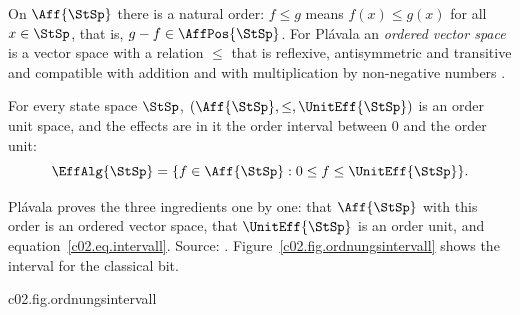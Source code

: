 \begin{fundament}[id=c02.f1,
    titel={Order unit spaces},
    wozu={The effects of a state space form an interval in an ordered vector space with
      an order unit. Here this structure is stated as Plávala gives it for finite
      dimension, and it is said what the course still owes beyond that.},
    voraussetzung={Block~\ref{c02.v2}; partial orders. Neither the core nor the other
      blocks need this block.},
    zurueck={A theory can be started from its states or from its effects; in finite
      dimension both lead to the same framework.}]
  On $\Aff{\StSp}$ there is a natural order: $f \leq g$ means $f(x) \leq g(x)$ for all
  $x \in \StSp$, that is, $g - f \in \AffPos{\StSp}$. For Plávala an \emph{ordered vector
  space} is a vector space with a relation $\leq$ that is reflexive, antisymmetric and
  transitive and compatible with addition and with multiplication by non-negative numbers
  .


  \begin{proposition}\label{c02.prop.oeraum}
    For every state space $\StSp$, $(\Aff{\StSp}, \leq, \UnitEff{\StSp})$ is an order unit
    space, and the effects are in it the order interval between $0$ and the order unit:
    \begin{equation}\label{c02.eq.intervall}
      \EffAlg{\StSp} = \{ f \in \Aff{\StSp} : 0 \leq f \leq \UnitEff{\StSp} \} .
    \end{equation}
  \end{proposition}

  Plávala proves the three ingredients one by one: that $\Aff{\StSp}$ with this order is an
  ordered vector space, that $\UnitEff{\StSp}$ is an order unit, and
  equation~\eqref{c02.eq.intervall}. Source:
  .
  Figure~\ref{c02.fig.ordnungsintervall} shows the interval for the classical bit.

  \begin{tpcfigure}{c02.fig.ordnungsintervall}
    \caption{The effect set of the classical bit as an order interval, in the coordinates
      $(q_0, q_1)$ of Proposition~\ref{c02.prop.bit}. The positive cone $\AffPos{\StSp}$ is
      the quadrant to the upper right of the origin. The condition
      $f \leq \UnitEff{\StSp}$ says that $\UnitEff{\StSp} - f$ lies in this cone; that is
      the quadrant to the lower left of $\UnitEff{\StSp}$. The intersection of the two
      quadrants is the unit square $\EffAlg{\StSp}$.}
  \end{tpcfigure}


\end{fundament}
